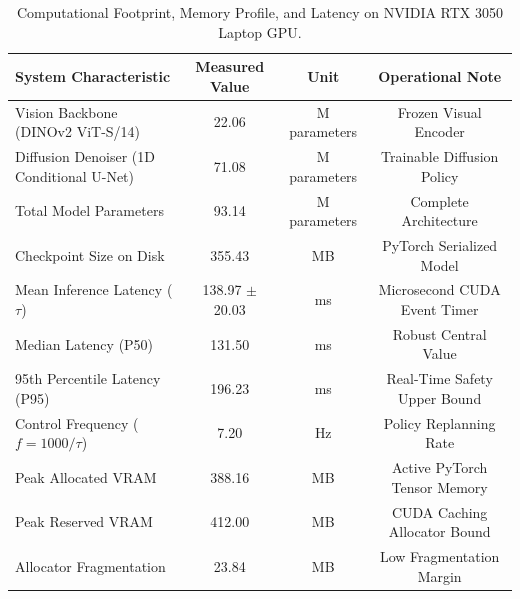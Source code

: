 \begin{table}[t]
\centering
\caption{Computational Footprint, Memory Profile, and Latency on NVIDIA RTX 3050 Laptop GPU.}
\label{tab:system_efficiency}
\begin{tabular}{lccc}
\toprule
\textbf{System Characteristic} & \textbf{Measured Value} & \textbf{Unit} & \textbf{Operational Note} \\
\midrule
Vision Backbone (DINOv2 ViT-S/14) & 22.06 & M parameters & Frozen Visual Encoder \\
Diffusion Denoiser (1D Conditional U-Net) & 71.08 & M parameters & Trainable Diffusion Policy \\
Total Model Parameters & 93.14 & M parameters & Complete Architecture \\
Checkpoint Size on Disk & 355.43 & MB & PyTorch Serialized Model \\
\midrule
Mean Inference Latency ($\tau$) & 138.97 $\pm$ 20.03 & ms & Microsecond CUDA Event Timer \\
Median Latency (P50) & 131.50 & ms & Robust Central Value \\
95th Percentile Latency (P95) & 196.23 & ms & Real-Time Safety Upper Bound \\
Control Frequency ($f = 1000/\tau$) & 7.20 & Hz & Policy Replanning Rate \\
\midrule
Peak Allocated VRAM & 388.16 & MB & Active PyTorch Tensor Memory \\
Peak Reserved VRAM & 412.00 & MB & CUDA Caching Allocator Bound \\
Allocator Fragmentation & 23.84 & MB & Low Fragmentation Margin \\
\bottomrule
\end{tabular}
\end{table}
